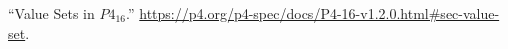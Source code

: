 \documentclass[11pt]{article}
\begin{document}
{{\begin{thebibliography}{38}
\mdbibitemlabel{{}[38]}\textquotedblleft{}Value Sets in $P4_{16}$.\textquotedblright{} \href{https://p4.org/p4-spec/docs/P4-16-v1.2.0.html\%23sec-value-set}{{\ttfamily https://\hspace{0pt}p4.\hspace{0pt}org/\hspace{0pt}p4-\hspace{0pt}spec/\hspace{0pt}docs/\hspace{0pt}P4-\hspace{0pt}16-\hspace{0pt}v1.\hspace{0pt}2.\hspace{0pt}0.\hspace{0pt}html\#\hspace{0pt}sec-\hspace{0pt}value-\hspace{0pt}set}}.\label{p4valuesets}%
\par%
\end{thebibliography}}%
}%
\end{document}
